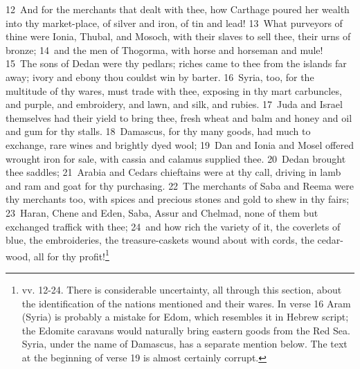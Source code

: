 \documentclass[10pt]{book} %
\begin{document}
\textcolor{benred8}{12}~And for the merchants that dealt with thee, how Carthage poured her wealth into thy market-place, of silver and iron, of tin and lead! \textcolor{benred8}{13}~What purveyors of thine were Ionia, Thubal, and Mosoch, with their slaves to sell thee, their urns of bronze; \textcolor{benred8}{14}~and the men of Thogorma, with horse and horseman and mule! \textcolor{benred8}{15}~The sons of Dedan were thy pedlars; riches came to thee from the islands far away; ivory and ebony thou couldst win by barter. \textcolor{benred8}{16}~Syria, too, for the multitude of thy wares, must trade with thee, exposing in thy mart carbuncles, and purple, and embroidery, and lawn, and silk, and rubies. \textcolor{benred8}{17}~Juda and Israel themselves had their yield to bring thee, fresh wheat and balm and honey and oil and gum for thy stalls. \textcolor{benred8}{18}~Damascus, for thy many goods, had much to exchange, rare wines and brightly dyed wool; \textcolor{benred8}{19}~Dan and Ionia and Mosel offered wrought iron for sale, with cassia and calamus supplied thee. \textcolor{benred8}{20}~Dedan brought thee saddles; \textcolor{benred8}{21}~Arabia and Cedar\textquotesingle s chieftains were at thy call, driving in lamb and ram and goat for thy purchasing. \textcolor{benred8}{22}~The merchants of Saba and Reema were thy merchants too, with spices and precious stones and gold to shew in thy fairs; \textcolor{benred8}{23}~Haran, Chene and Eden, Saba, Assur and Chelmad, none of them but exchanged traffick with thee; \textcolor{benred8}{24}~and how rich the variety of it, the coverlets of blue, the embroideries, the treasure-caskets wound about with cords, the cedar-wood, all for thy profit!\footnote[4]{vv. 12-24. There is considerable uncertainty, all through this section, about the identification of the nations mentioned and their wares. In verse 16 Aram (Syria) is probably a mistake for Edom, which resembles it in Hebrew script; the Edomite caravans would naturally bring eastern goods from the Red Sea. Syria, under the name of Damascus, has a separate mention below. The text at the beginning of verse 19 is almost certainly corrupt.}
\end{document}

